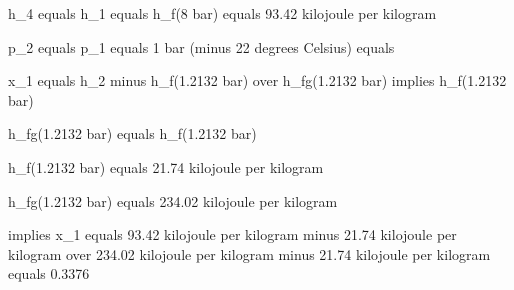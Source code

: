 h_4 equals h_1 equals h_f(8 bar) equals 93.42 kilojoule per kilogram

p_2 equals p_1 equals 1 bar (minus 22 degrees Celsius) equals

x_1 equals h_2 minus h_f(1.2132 bar) over h_fg(1.2132 bar) implies h_f(1.2132 bar)

h_fg(1.2132 bar) equals h_f(1.2132 bar)

h_f(1.2132 bar) equals 21.74 kilojoule per kilogram

h_fg(1.2132 bar) equals 234.02 kilojoule per kilogram

implies x_1 equals 93.42 kilojoule per kilogram minus 21.74 kilojoule per kilogram over 234.02 kilojoule per kilogram minus 21.74 kilojoule per kilogram equals 0.3376